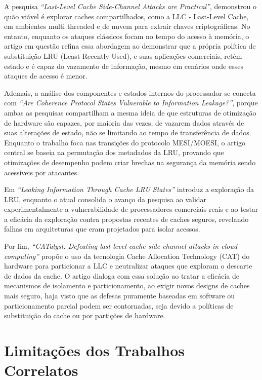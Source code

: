 \documentclass[12pt]{article}
\begin{document}
 A pesquisa \textit{“Last-Level Cache Side-Channel Attacks are Practical”}\cite{7163050}, demonstrou o quão viável é explorar caches compartilhados, como a LLC - Last-Level Cache, em ambientes multi threaded e de nuvem para extrair chaves criptográficas. No entanto, enquanto os ataques clássicos focam no tempo do acesso à memória, o artigo em questão refina essa abordagem ao demonstrar que a própria política de substituição LRU (Least Recently Used), e suas aplicações comerciais, retém estado e é capaz do vazamento de informação, mesmo em cenários onde  esses ataques de acesso é menor. 

Ademais, a análise dos componentes e estados internos do processador se conecta com \textit{“Are Coherence Protocol States Vulnerable to Information Leakage?”}\cite{8327007}, porque ambas as pesquisas compartilham a mesma ideia de que estruturas de otimização de hardware são capazes, por maioria das vezes, de vazarem dados através de suas alterações de estado, não se limitando ao tempo de transferência de dados. Enquanto o trabalho foca nas transições do protocolo MESI/MOESI, o artigo central se baseia na permutação dos metadados da LRU, provando que otimizações de desempenho podem criar brechas na segurança da memória sendo acessíveis por atacantes.

Em \textit{“Leaking Information Through Cache LRU States”}\cite{9065598} introduz a exploração da LRU, enquanto o atual consolida o avanço da pesquisa ao validar experimentalmente a vulnerabilidade de processadores comerciais reais e ao testar a eficácia da exploração contra propostas recentes de caches seguros, revelando falhas em arquiteturas que eram projetados para isolar acessos. 

Por fim, \textit{“CATalyst: Defeating last-level cache side channel attacks in cloud computing”}\cite{7446082} propõe o uso da tecnologia Cache Allocation Technology (CAT) do hardware para particionar a LLC e neutralizar ataques que exploram o descarte de dados da cache. O artigo dialoga com essa solução ao tratar a eficácia de mecanismos de isolamento e particionamento, ao exigir novos designs de caches mais seguro, haja visto que as defesas puramente baseadas em software ou particionamento parcial podem ser contornadas, seja devido a políticas de substituição do cache ou por partições de hardware. 

\section{Limitações dos Trabalhos Correlatos}
\end{document}
